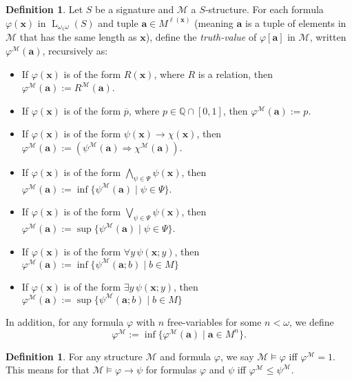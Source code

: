 \documentclass{amsart}
\theoremstyle{definition}
\newtheorem{definition}[theorem]{Definition}
\numberwithin{equation}{theorem}
\renewcommand{\phi}{\varphi}
\newcommand{\Q}{\mathbb{Q}}
\newcommand{\V}{\mathbf}
\newcommand{\where}{\mid}
\newcommand{\rat}[1]{{\overline{#1}}}
\newcommand{\narrow}[1]{\xrightarrow{#1}}
\renewcommand{\to}{\narrow{}}
\newcommand{\len}{\ell}
\newcommand{\baselang}{\operatorname{L}}
\newcommand{\lang}{\baselang_{\omega_1\omega}}
\begin{document}
\begin{definition}
  Let $S$ be a signature and $\mathcal M$ a $S$-structure.
  For each formula $\phi(\V x)$ in $\lang(S)$ and tuple $\V a\in M^{\len(\V x)}$ (meaning $\V a$ is a tuple of elements in $\mathcal M$ that has the same length as $\V x$), define the \emph{truth-value} of $\phi[\V a]$ in $\mathcal M$, written $\phi^\mathcal M(\V a)$, recursively as:
  \begin{itemize}
  \item If $\phi(\V x)$ is of the form $R(\V x)$, where $R$ is a relation, then $\phi^\mathcal M(\V a):=R^\mathcal M(\V a)$.
  \item If $\phi(\V x)$ is of the form $\rat p$, where $p\in\Q\cap[0,1]$, then $\phi^\mathcal M(\V a):=p$.
  \item If $\phi(\V x)$ is of the form $\psi(\V x)\to\chi(\V x)$, then $\phi^\mathcal M(\V a):=(\psi^\mathcal M(\V a)\Rightarrow\chi^\mathcal M(\V a))$.
  \item If $\phi(\V x)$ is of the form $\bigwedge_{\psi\in\Psi}\psi(\V x)$, then $\phi^\mathcal M(\V a):=\inf\{\psi^\mathcal M(\V a)\where \psi\in\Psi\}$.
  \item If $\phi(\V x)$ is of the form $\bigvee_{\psi\in\Psi}\psi(\V x)$, then $\phi^\mathcal M(\V a):=\sup\{\psi^\mathcal M(\V a)\where \psi\in\Psi\}$.
  \item If $\phi(\V x)$ is of the form $\forall y\,\psi(\V x;y)$, then $\phi^\mathcal M(\V a):=\inf\{\psi^\mathcal M(\V a;b)\where b\in M\}$
  \item If $\phi(\V x)$ is of the form $\exists y\,\psi(\V x;y)$, then $\phi^\mathcal M(\V a):=\sup\{\psi^\mathcal M(\V a;b)\where b\in M\}$
  \end{itemize}
  In addition, for any formula $\phi$ with $n$ free-variables for some $n<\omega$, we define
  \[
    \phi^\mathcal M:=\inf\{\phi^\mathcal M(\V a)\where \V a\in M^n\}.
  \]
\end{definition}
\begin{definition}
  For any structure $\mathcal M$ and formula $\phi$, we say $\mathcal M\models\phi$ iff $\phi^\mathcal M=1$.
  This means for that $\mathcal M\models\phi\to\psi$ for formulas $\phi$ and $\psi$ iff $\phi^\mathcal M\leq\psi^\mathcal M$.
\end{definition}
\end{document}
